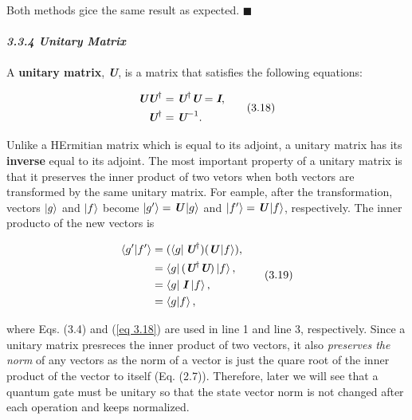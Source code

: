 \documentclass{article}
\begin{document}
Both methods gice the same result as expected. \hfill $\blacksquare$
\\\\
\textit{\textbf{\large 3.3.4 Unitary Matrix }}
\\\\
A \textbf{unitary matrix}, \textit{\textbf{U}}, is a matrix that satisfies the following equations:

\begin{align} \label{eq 3.18}
    \begin{split}
        \textit{\textbf{U}}\textit{\textbf{U}}^\dagger&=\textit{\textbf{U}}^\dagger\textit{\textbf{U}}=\textit{\textbf{I}}, \\
       \textit{\textbf{U}}^\dagger &= \textit{\textbf{U}}^{-1}.
    \end{split} \tag{3.18}
\end{align}

Unlike a HErmitian matrix which is equal to its adjoint, a unitary matrix has its \textbf{inverse} equal to
its adjoint. The most important property of a unitary matrix is that it preserves
the inner product of two vetors when both vectors are transformed by 
the same unitary matrix. For eample, after the transformation, vectors $\ket{g}$ and $\ket{f}$
become $\ket{g^\prime}=\textit{\textbf{U}}\ket{g}$ and $\ket{f^\prime}=\textit{\textbf{U}}\ket{f}$,
respectively. The inner producto of the new vectors is

\begin{align} \label{eq 3.19}
    \begin{split}
        \braket{g^\prime|f^\prime}&=(\bra{g}\textit{\textbf{U}}^{\dagger})(\textit{\textbf{U}}\ket{f}),\\
    &=\bra{g}(\textit{\textbf{U}}^{\dagger}\textit{\textbf{U}})\ket{f},\\
        &= \braket{g|\;\textit{\textbf{I}} \;|f},\\
        &=\braket{g|f},
\end{split} \tag{3.19}
\end{align}

where Eqs. (3.4) and (\ref{eq 3.18}) are used in line 1 and line 3, respectively. Since a unitary matrix presreces the inner product of two vectors, it also 
\textit{preserves the norm} of any vectors as the norm of a vector is just the quare root of the inner product of the vector to itself (Eq. (2.7)).
Therefore, later we will see that a quantum gate must be unitary so that the state vector norm is not changed after each operation and keeps normalized.
\end{document}

